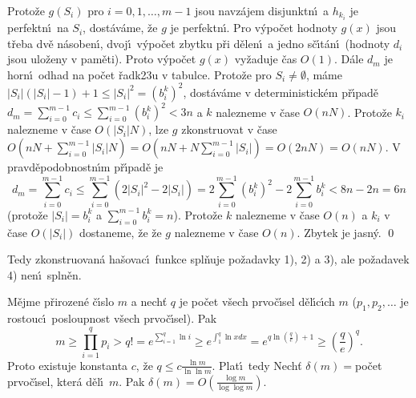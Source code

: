 Proto\v ze $g\left(S_i\right)$ pro $i=0,1,\dots,m-1$ 
jsou navz\'ajem disjunktn\'\i\ a $h_{k_i}$ je perfektn\'\i\ na $S_
i$, 
dost\'av\'ame, \v ze $g$ je perfektn\'\i . Pro v\'ypo\v cet hodnoty $
g\left(x\right)$ 
jsou t\v reba dv\v e n\'asoben\'\i , dvoj\'\i\ v\'ypo\v cet zbytku p\v ri 
d\v elen\'\i\ a jedno s\v c\'\i t\'an\'\i\ (hodnoty $d_i$ jsou ulo\v zeny v 
pam\v eti). Proto v\'ypo\v cet $g\left(x\right)$ vy\v zaduje \v cas $O\left(1\right)$. D\'ale 
$d_m$ je horn\'\i\ odhad na po\v cet \v radk\accent23u v tabulce. 
Proto\v ze pro $S_i\ne\emptyset$, m\'ame $|S_i|\left(|S_i|-1\right)+1\le |S_
i|^2=\left(b_i^k\right)^2$, 
dost\'av\'ame v deterministick\'em p\v r\'\i pad\v e 
$d_m=\sum_{i=0}^{m-1}c_i\le\sum_{i=0}^{m-1}\left(b_i^k\right)^2<3n$ a $k$ nalezneme v \v case 
$O\left(nN\right)$. Proto\v ze $k_i$ nalezneme v \v case $O\left(|S_i|N\right)$, lze $g$ 
zkonstruovat v \v case 
$O\left(nN+\sum_{i=0}^{m-1}|S_i|N\right)=O\left(nN+N\sum_{i=0}^{m-1}|S_i|\right)=O\left(2nN\right)
=O\left(nN\right)$. 
V pravd\v epodob\-nostn\'\i m p\v r\'\i pad\v e je 
$$d_m=\sum_{i=0}^{m-1}c_i\le\sum_{i=0}^{m-1}\left(2|S_i|^2-2|S_
i|\right)=2\sum_{i=0}^{m-1}\left(b_i^k\right)^2-2\sum_{i=0}^{m-1}b_i^k<8n-2n=6n$$
(proto\v ze $|S_i|=b_i^k$ a $\sum_{i=0}^{m-1}b_i^k=n$). Proto\v ze $
k$ nalezneme v \v case $O\left(n\right)$ a $k_i$ v \v case $O\left(|S_i|\right)$ dostaneme, \v ze 
\v ze $g$ nalezneme v \v case $O\left(n\right)$. Zbytek je jasn\'y. \qed
\enddemo

\flushpar Tedy zkonstruovan\'a ha\v sovac\'\i\ funkce spl\v nuje po\v zadavky 
1), 2) a 3), ale po\v zadavek 4) nen\'\i\ spln\v en. 
\medskip

\flushpar M\v ejme p\v rirozen\'e \v c\'\i slo $m$ a nech\v t $q$ je po\v cet v\v sech prvo\v c\'\i sel 
d\v el\'\i c\'\i ch $m$ ($p_1,p_2,\dots$ je rostouc\'\i\ posloupnost v\v sech 
prvo\v c\'\i sel). Pak
$$m\ge\prod_{i=1}^qp_i>q!=e^{\sum_{i=1}^q\ln i}\ge e^{\int_1^q\ln 
xdx}=e^{q\ln\left(\frac qe\right)+1}\ge \left(\frac qe\right)^q.$$
Proto existuje konstanta $c$, \v ze $q\le c\frac {\ln m}{\ln\ln m}$. Plat\'\i\ tedy  
Nech\v t $\delta \left(m\right)=$po\v cet prvo\v c\'\i sel, kter\'a d\v el\'\i\ 
$m$. Pak $\delta \left(m\right)=O\left(\frac {\log m}{\log\log m}\right)$.
\endproclaim

